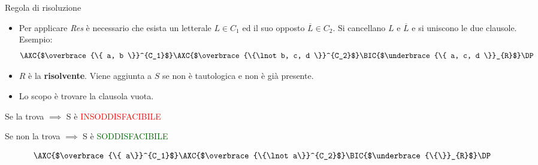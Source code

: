 \documentclass{beamer}
\begin{document}
\begin{frame}{Regola di risoluzione}
    \begin{itemize}
        \item Per applicare \emph{Res} è necessario che esista un letterale $L \in C_1$ ed il suo opposto $\overline{L} \in C_2$. Si cancellano $L$ e $\overline{L}$ e si uniscono le due clausole.
        Esempio:
        \[
            \AXC{$\overbrace{\{ a, b \}}^{C_1}$}
            \AXC{$\overbrace{\{\lnot b, c, d \}}^{C_2}$}
            \RightLabel{Res}
            \BIC{$\underbrace{\{ a, c, d \}}_{R}$}
            \DP
        \]
        \item $R$ è la \textbf{risolvente}. Viene aggiunta a $S$ se non è tautologica e non è già presente.
        
    \end{itemize}

    \begin{center}
        \begin{minipage}{0.45\textwidth}
            \begin{itemize}
                \item Lo scopo è trovare la clausola vuota.
            \end{itemize}
            Se la trova $\implies$ S è \textcolor{red}{INSODDISFACIBILE}

            Se non la trova $\implies$ S è \textcolor{darkgreen}{SODDISFACIBILE}
        \end{minipage}
        \hspace{0.05\textwidth}
        \begin{minipage}{0.45\textwidth}
            \small
            \[
                \AXC{$\overbrace{\{ a\}}^{C_1}$}
                \AXC{$\overbrace{\{\lnot a\}}^{C_2}$}
                \RightLabel{Res}
                \BIC{$\underbrace{\{\}}_{R}$}
                \DP
            \]
        \end{minipage}
    \end{center}
\end{frame}

\end{document}
